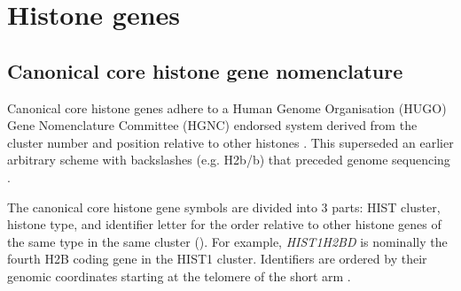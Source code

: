 \section{Histone genes}

  \subsection{Canonical core histone gene nomenclature}
    Canonical core histone genes adhere to a Human Genome Organisation (HUGO)
    Gene Nomenclature Committee (HGNC)
    endorsed system derived from the cluster number and position relative
    to other histones \citep{Marzluff02}.
    This superseded an earlier arbitrary scheme with backslashes (e.g. H2b/b)
    that preceded genome sequencing \citep{AlbigGenomics1997,AlbigHumangen1997}.

    The canonical core histone gene symbols are divided into 3 parts:
    HIST cluster, histone type, and identifier letter
    for the order relative to other histone genes of the same type in
    the same cluster ().
    For example, \textit{HIST1H2BD} is nominally the fourth H2B coding gene in the HIST1 cluster.
    Identifiers are ordered by their genomic coordinates starting at
    the telomere of the short arm \citep{Marzluff02}.

